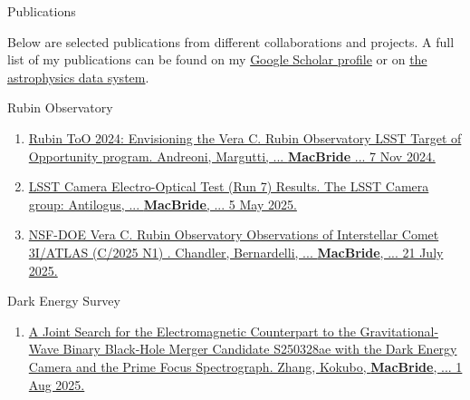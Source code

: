 \documentclass{resume} %
\begin{document}
\begin{rSection}{Publications}


Below are selected publications from different collaborations and projects. A full list of my publications can be found on my \href{https://scholar.google.com/citations?user=XtRTswUAAAAJ&hl=en}{Google Scholar profile} or on \href{https://ui.adsabs.harvard.edu/search/fq=\%7B!type\%3Daqp\%20v\%3D\%24fq_database\%7D&fq_database=(database\%3Aastronomy\%20OR\%20database\%3Aphysics)&p_=0&q=((\%20author\%3A\%22Macbride\%2C\%20Sean\%22)\%20AND\%20year\%3A2019-2150)&sort=date\%20desc\%2C\%20bibcode\%20desc}{the astrophysics data system}.

    \begin{rSubsection}{Rubin Observatory}{}{}{} %
        \begin{enumerate}
        \item \href{https://arxiv.org/abs/2411.04793}{Rubin ToO 2024: Envisioning the Vera C. Rubin Observatory LSST Target of Opportunity program. Andreoni, Margutti, ... \textbf{MacBride} ... 7 Nov 2024.} 
            \item \href{https://sitcomtn-148.lsst.io/}{LSST Camera Electro-Optical Test (Run 7) Results. The LSST Camera group: Antilogus, ... \textbf{MacBride}, ... 5 May 2025.} 
        \item \href{https://arxiv.org/pdf/2507.13409}{ NSF-DOE Vera C. Rubin Observatory Observations of Interstellar Comet 3I/ATLAS (C/2025 N1) . Chandler, Bernardelli, ... \textbf{MacBride}, ... 21 July 2025.} 
        \end{enumerate}
            
    \end{rSubsection} 
    
    \begin{rSubsection}{Dark Energy Survey}{}{}{} %
        \begin{enumerate}
            \item \href{https://arxiv.org/abs/2508.00291}{A Joint Search for the Electromagnetic Counterpart to the Gravitational-Wave Binary Black-Hole Merger Candidate S250328ae with the Dark Energy Camera and the Prime Focus Spectrograph. Zhang, Kokubo, \textbf{MacBride}, ... 1 Aug 2025.} 
            
        \end{enumerate}
            

\end{rSubsection}
\end{rSection}
\end{document}
